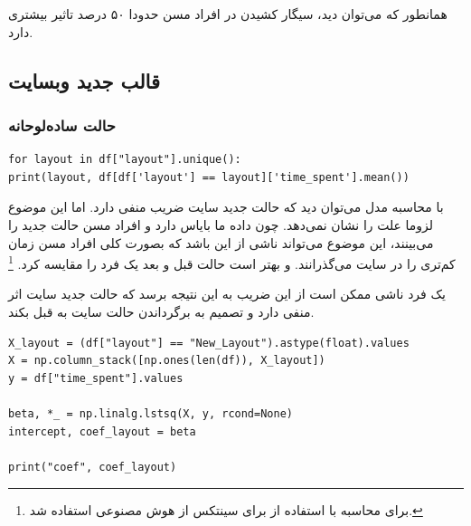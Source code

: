 \begin{enumerate}
	همانطور که می‌توان دید، سیگار کشیدن در افراد مسن حدودا ۵۰ درصد تاثیر بیشتری دارد.
\end{enumerate}
\subsection{قالب جدید وبسایت}
\subsubsection{حالت ساده‌لوحانه}
	\begin{program}[H]
	\begin{latin}
		\begin{verbatim}
for layout in df["layout"].unique():
print(layout, df[df['layout'] == layout]['time_spent'].mean())
		\end{verbatim}
		\label{q2:web_mean}
	\end{latin}
	\caption{محاسبه میانگین زمان صرف‌شده در هر حالت سایت}
\end{program}

با محاسبه مدل 
می‌توان دید که حالت جدید سایت ضریب منفی دارد. اما این موضوع لزوما علت را نشان نمی‌دهد. چون داده ما بایاس دارد و افراد مسن حالت جدید را می‌بینند، این موضوع می‌تواند ناشی از این باشد که بصورت کلی افراد مسن زمان کم‌تری را در سایت می‌گذرانند. و بهتر است حالت قبل و بعد یک فرد را مقایسه کرد. 
\footnote{برای محاسبه  با استفاده از  برای سینتکس از هوش مصنوعی استفاده شد.}

یک فرد ناشی ممکن است از این ضریب به این نتیجه برسد که حالت جدید سایت اثر منفی دارد و تصمیم به برگرداندن حالت سایت به قبل بکند. 
	\begin{program}[H]
	\begin{latin}
		\begin{verbatim}
X_layout = (df["layout"] == "New_Layout").astype(float).values
X = np.column_stack([np.ones(len(df)), X_layout])   
y = df["time_spent"].values

beta, *_ = np.linalg.lstsq(X, y, rcond=None)
intercept, coef_layout = beta

print("coef", coef_layout)
		\end{verbatim}
		\label{q2:web_ols}
	\end{latin}
	\caption{محاسبه میانگین زمان صرف‌شده در هر حالت سایت}
\end{program}

